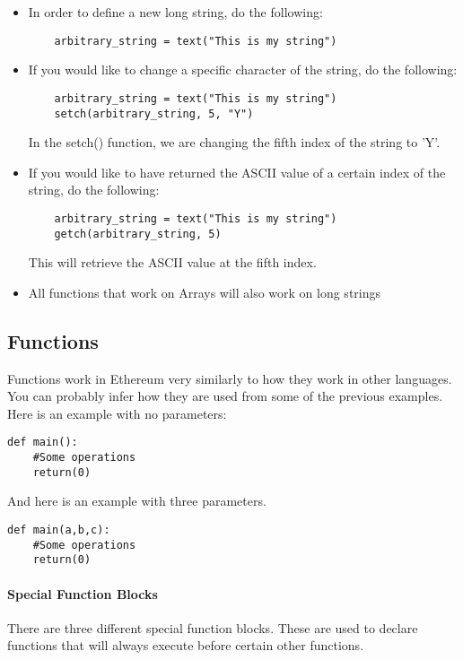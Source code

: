 \documentclass[12pt]{article}
\begin{document}
\begin{itemize}
\item In order to define a new long string, do the following:
	\begin{lstlisting}
	arbitrary_string = text("This is my string")
	\end{lstlisting}
\item If you would like to change a specific character of the string, do the following:
	\begin{lstlisting}
	arbitrary_string = text("This is my string")
	setch(arbitrary_string, 5, "Y")
	\end{lstlisting}
	In the setch() function, we are changing the fifth index of the string to 'Y'.
\item If you would like to have returned the ASCII value of a certain index of the string, do the following:
	\begin{lstlisting}
	arbitrary_string = text("This is my string")
	getch(arbitrary_string, 5)
	\end{lstlisting}
	This will retrieve the ASCII value at the fifth index.
\item All functions that work on Arrays will also work on long strings
\end{itemize} \cite{Serpent,Serpent 1.0 (old)}
	
\subsection{Functions}
Functions work in Ethereum very similarly to how they work in other languages. You can probably infer how they are used from some of the previous examples. Here is an example with no parameters:

\begin{lstlisting}
def main():
	#Some operations
	return(0)
\end{lstlisting}

And here is an example with three parameters.

\begin{lstlisting}
def main(a,b,c):
	#Some operations
	return(0)
\end{lstlisting}

\paragraph{Special Function Blocks}
There are three different special function blocks. These are used to declare functions that will always execute before certain other functions.
\end{document}
